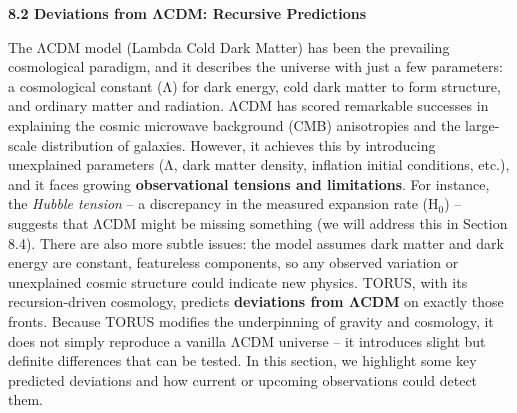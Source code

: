 \documentclass[]{article}
\newcommand{\subscript}[1]{\ensuremath{_{\mathrm{#1}}}}
\begin{document}
\textbf{8.2 Deviations from ΛCDM: Recursive Predictions}

The ΛCDM model (Lambda Cold Dark Matter) has been the prevailing
cosmological paradigm, and it describes the universe with just a few
parameters: a cosmological constant (Λ) for dark energy, cold dark
matter to form structure, and ordinary matter and radiation. ΛCDM has
scored remarkable successes in explaining the cosmic microwave
background (CMB) anisotropies and the large-scale distribution of
galaxies. However, it achieves this by introducing unexplained
parameters (Λ, dark matter density, inflation initial conditions, etc.),
and it faces growing \textbf{observational tensions and limitations}.
For instance, the \emph{Hubble tension} -- a discrepancy in the measured
expansion rate
(H\subscript{0}) --
suggests that ΛCDM might be missing something (we will address this in
Section 8.4). There are also more subtle issues: the model assumes dark
matter and dark energy are constant, featureless components, so any
observed variation or unexplained cosmic structure could indicate new
physics. TORUS, with its recursion-driven cosmology, predicts
\textbf{deviations from ΛCDM} on exactly those fronts. Because TORUS
modifies the underpinning of gravity and cosmology, it does not simply
reproduce a vanilla ΛCDM universe -- it introduces slight but definite
differences that can be tested. In this section, we highlight some key
predicted deviations and how current or upcoming observations could
detect them.
\end{document}
